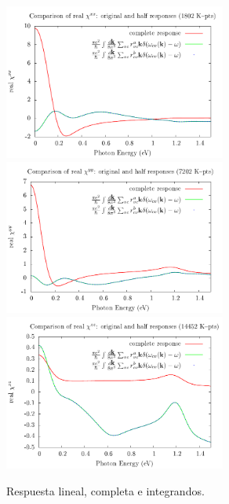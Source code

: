 \documentclass[11pt]{article}
\begin{document}
\begin{figure}
	\begin{center}
		\includegraphics[width=0.65\textwidth]{./figures/boat/res1_chi_1_posMatElemen-1-2-original_sm}\\
		\includegraphics[width=0.65\textwidth]{./figures/boat/res1_chi_2_sposMatEleme-1-n-original2_m}\\
		\includegraphics[width=0.65\textwidth]{./figures/boat/res1_chi_3_sposMatEleme-1-n-original2_m}
	\end{center}
	\caption{Respuesta lineal, completa e integrandos.}
	\label{fig:lineal_boat}
\end{figure}
\end{document}
